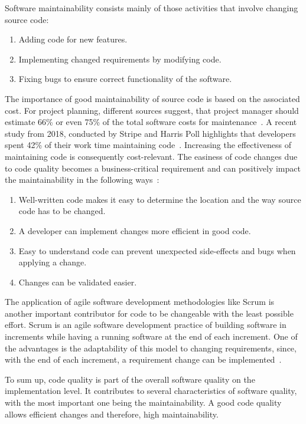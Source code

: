 Software maintainability consists mainly of those activities that involve changing source code:
\begin{enumerate}
    \item Adding code for new features.
    \item Implementing changed requirements by modifying code.
    \item Fixing bugs to ensure correct functionality of the software.
\end{enumerate}
The importance of good maintainability of source code is based on the associated cost. 
For project planning, different sources suggest, that project manager should estimate 66\% or even 75\% of the total software costs for maintenance~\cite{yip_software_1994, galorath_accurately_2019}. A recent study from 2018, conducted by Stripe and Harris Poll highlights that developers spent 42\% of their work time maintaining code~\cite{stripe_developer_2018}. Increasing the effectiveness of maintaining code is consequently cost-relevant. The easiness of code changes due to code quality becomes a business-critical requirement and can positively impact the maintainability in the following ways~\cite{baggen_standardized_2012}:
\begin{enumerate}
    \item Well-written code makes it easy to determine the location and the way source code has to be changed.
    \item A developer can implement changes more efficient in good code.
    \item Easy to understand code can prevent unexpected side-effects and bugs when applying a change.
    \item Changes can be validated easier. 
\end{enumerate}

The application of agile software development methodologies like Scrum is another important contributor for code to be changeable with the least possible effort. Scrum is an agile software development practice of building software in increments while having a running software at the end of each increment. One of the advantages is the adaptability of this model to changing requirements, since, with the end of each increment, a requirement change can be implemented~\cite{schwaber_agile_2002}. 

To sum up, code quality is part of the overall software quality on the implementation level. It contributes to several characteristics of software quality, with the most important one being the maintainability. A good code quality allows efficient changes and therefore, high maintainability.

